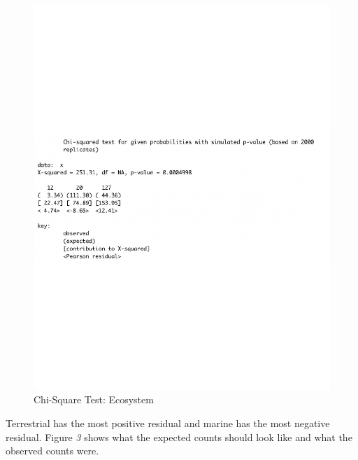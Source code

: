 \documentclass[
]{article}
\begin{document}
\begin{figure}
  \caption{Chi-Square Test: Ecosystem}
    \includegraphics[width=13cm]{chi-eco-2.pdf}
\end{figure}

Terrestrial has the most positive residual and marine has the most
negative residual. Figure \emph{3} shows what the expected counts should
look like and what the observed counts were.
\end{document}
